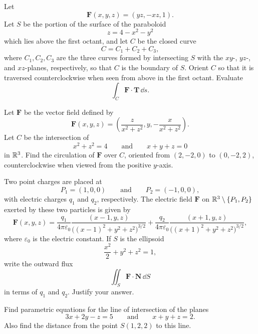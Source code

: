 \begin{problem}
Let
\[
\mathbf F(x, y, z)=(yz, -xz, 1).
\]
Let $S$ be the portion of the surface of the paraboloid
\[
z=4-x^2-y^2
\]
which lies above the first octant, and let $C$ be the closed curve
\[
C=C_1+C_2+C_3,
\]
where $C_1, C_2, C_3$ are the three curves formed by intersecting $S$ with the $xy$-, $yz$-, and $xz$-planes, respectively, so that $C$ is the boundary of $S$. Orient $C$ so that it is traversed counterclockwise when seen from above in the first octant. Evaluate
\[
\int_C\mathbf F\cdot\mathbf T\,\dd s.
\]
\end{problem}

\begin{problem}
Let $\mathbf F$ be the vector field defined by
\[
\mathbf F(x, y, z)
=
\left(
\frac{z}{x^2+z^2},
 y,
-\frac{x}{x^2+z^2}
\right).
\]
Let $C$ be the intersection of
\[
x^2+z^2=4
\qquad\text{and}\qquad
x+y+z=0
\]
in $\mathbb{R}^3$. Find the circulation of $\mathbf F$ over $C$, oriented from $(2, -2, 0)$ to $(0, -2, 2)$, counterclockwise when viewed from the positive $y$-axis.
\end{problem}

\begin{problem}
Two point charges are placed at
\[
P_1=(1, 0, 0)
\qquad\text{and}\qquad
P_2=(-1, 0, 0),
\]
with electric charges $q_1$ and $q_2$, respectively. The electric field $\mathbf F$ on $\mathbb{R}^3\setminus\{P_1, P_2\}$ exerted by these two particles is given by
\[
\mathbf F(x, y, z)
=
\frac{q_1}{4\pi\varepsilon_0}
\frac{(x-1, y, z)}{\bigl((x-1)^2+y^2+z^2\bigr)^{3/2}}
+
\frac{q_2}{4\pi\varepsilon_0}
\frac{(x+1, y, z)}{\bigl((x+1)^2+y^2+z^2\bigr)^{3/2}},
\]
where $\varepsilon_0$ is the electric constant. If $S$ is the ellipsoid
\[
\frac{x^2}{2}+y^2+z^2=1,
\]
write the outward flux
\[
\iint_S\mathbf F\cdot\mathbf N\,\dd S
\]
in terms of $q_1$ and $q_2$. Justify your answer.
\end{problem}

\begin{problem}
Find parametric equations for the line of intersection of the planes
\[
3x+2y-z=5
\qquad\text{and}\qquad
x+y+z=2.
\]
Also find the distance from the point $S(1, 2, 2)$ to this line.
\end{problem}

